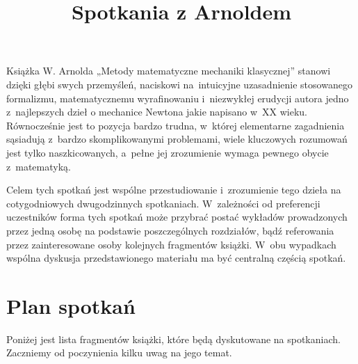 \documentclass[a4paper,11pt]{article}
\title{Spotkania z Arnoldem}
\begin{document}





\maketitle %





Książka W. Arnolda „Metody matematyczne mechaniki klasycznej”
stanowi dzięki głębi swych przemyśleń, naciskowi na~intuicyjne
uzasadnienie stosowanego formalizmu, matematycznemu wyrafinowaniu
i~niezwykłej erudycji autora jedno z~najlepszych dzieł o mechanice Newtona jakie napisano w~XX wieku. Równocześnie jest to pozycja bardzo trudna, w~której elementarne zagadnienia sąsiadują
z~bardzo skomplikowanymi problemami, wiele kluczowych rozumowań jest
tylko naszkicowanych, a~pełne jej zrozumienie wymaga pewnego obycie
z~matematyką.

Celem tych spotkań jest wspólne przestudiowanie i~zrozumienie tego
dzieła na cotygodniowych dwugodzinnych spotkaniach. W~zależności od
preferencji uczestników forma tych spotkań może przybrać postać
wykładów prowadzonych przez jedną osobę na podstawie poszczególnych
rozdziałów, bądź referowania przez zainteresowane osoby kolejnych
fragmentów książki. W~obu wypadkach wspólna dyskusja przedstawionego
materiału ma być centralną częścią spotkań.




\section{Plan spotkań}



\noindent
Poniżej jest lista fragmentów książki, które będą dyskutowane na
spotkaniach. Zaczniemy od poczynienia kilku uwag na jego temat.
\end{document}
